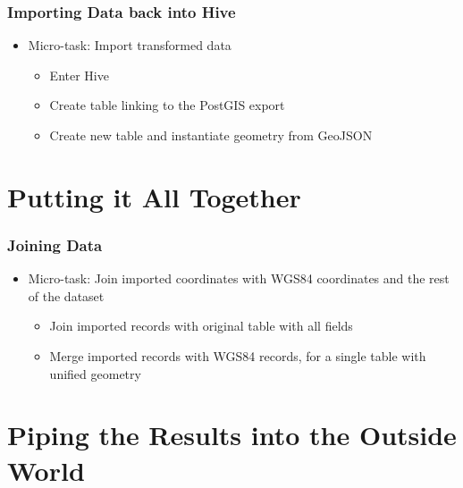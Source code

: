 \documentclass[hyperref={pdfpagelabels=true}]{beamer}
\begin{document}

\begin{frame}
\frametitle{Importing Data back into Hive}
\begin{itemize}
  \item<1->Micro-task: Import transformed data
  \begin{itemize}
    \item<2->Enter Hive
    \item<3->Create table linking to the PostGIS export    
    \item<4->Create new table and instantiate geometry from GeoJSON
  \end{itemize}
\end{itemize}
\end{frame}


\section{Putting it All Together} 
\begin{frame}
\frametitle{Joining Data}
\begin{itemize}
  \item<1->Micro-task: Join imported coordinates with WGS84 coordinates and the rest of the dataset
  \begin{itemize}
    \item<2->Join imported records with original table with all fields
    \item<3->Merge imported records with WGS84 records, for a single table with unified geometry
  \end{itemize}
\end{itemize}
\end{frame}

\section{Piping the Results into the Outside World} 
\end{document}

